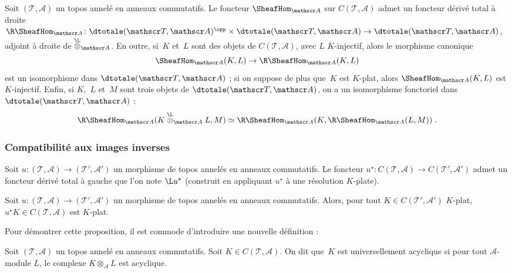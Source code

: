 \documentclass[10pt]{../fichiers-configuration-latex/smfart}
\begin{document}
\begin{proposition3}
Soit $(\mathscr T,\mathscr A)$ un topos annelé en anneaux commutatifs.
Le foncteur $\SheafHom_{\mathscr A}$ sur $C(\mathscr T,\mathscr A)$ admet
un foncteur dérivé total à droite $\R\SheafHom_{\mathscr A}\colon
\dtotale(\mathscr T,\mathscr A)^\opp
\times\dtotale(\mathscr T,\mathscr A)\to \dtotale(\mathscr T,\mathscr
A)$, adjoint à droite de $\overset{\L}\otimes_{\mathscr A}$. En
outre, si $K$ et $L$ sont des objets de $C(\mathscr T,\mathscr A)$, avec
$L$ $K$-injectif, alors le morphisme canonique 
\[\SheafHom_{\mathscr A}(K,L)\to\R\SheafHom_{\mathscr A}(K,L)\]
est un isomorphisme dans $\dtotale(\mathscr T,\mathscr A)$ ; si on suppose
de plus que $K$ est $K$-plat, alors $\SheafHom_{\mathscr A}(K,L)$ est
$K$-injectif. Enfin, si $K$, $L$ et $M$ sont trois objets de
$\dtotale(\mathscr T,\mathscr A)$, on a un isomorphisme fonctoriel dans
$\dtotale(\mathscr T,\mathscr A)$  :
\[\R\SheafHom_{\mathscr A}(K\overset{\L}\otimes_{\mathscr A} L,M)
\simeq \R\SheafHom_{\mathscr A}(K,
\R\SheafHom_{\mathscr A}(L,M))\;\text{.}\]
\end{proposition3}

\subsubsection{Compatibilité aux images inverses}%

\begin{definition3}
Soit $u\colon (\mathscr T,\mathscr A)\to (\mathscr T',\mathscr A')$ un
morphisme de topos annelés en anneaux commutatifs. Le foncteur
$u^\star\colon C(\mathscr T,\mathscr A)\to C(\mathscr T',\mathscr A')$
admet un foncteur dérivé total à gauche que l'on note $\L u^\star$
(construit en appliquant $u^\star$ à une résolution $K$-plate).
\end{definition3}

\begin{proposition3}\label{17-proposition-u-star-preserve-k-platitude}
Soit $u\colon (\mathscr T,\mathscr A)\to (\mathscr T',\mathscr A')$ un
morphisme de topos annelés en anneaux commutatifs. Alors, pour tout $K\in
C(\mathscr T',\mathscr A')$ $K$-plat, $u^\star K\in C(\mathscr T,\mathscr
A)$ est $K$-plat.
\end{proposition3}

Pour démontrer cette proposition, il est commode d'introduire une nouvelle
définition :

\begin{definition3}
Soit $(\mathscr T,\mathscr A)$ un topos annelé en anneaux commutatifs.
Soit $K\in C(\mathscr T,\mathscr A)$. On dit que $K$ est
universellement acyclique si pour tout $\mathscr A$-module $L$, le complexe
$K\otimes_{\mathscr A} L$ est acyclique.
\end{definition3}
\end{document}
